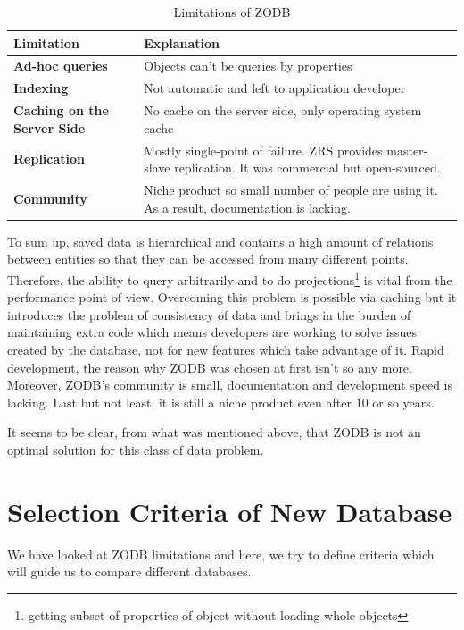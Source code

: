 \begin{table}[!ht]
  \centering
  \caption{Limitations of \textsc{ZODB}}
  \renewcommand{\arraystretch}{1.5}
  \begin{tabular}{| >{\centering\bfseries}m{2in} | >{\centering\arraybackslash}m{3.5in} |}
	\hline	
	\textbf{Limitation} & \textbf{Explanation} \\ \hline
    Ad-hoc queries & Objects can't be queries by properties \\ \hline
    Indexing & Not automatic and left to application developer \\ \hline
    Caching on the Server Side & No cache on the server side, only operating system cache \\ \hline
    Replication & Mostly single-point of failure. \textsc{ZRS} provides master-slave replication. It was commercial but open-sourced. \\ \hline
    Community & Niche product so small number of people are using it. As a result, documentation is lacking. \\ \hline	
  \end{tabular}
  \label{limitations}
\end{table}

To sum up, saved data is hierarchical and contains a high amount of relations between entities so that they can be accessed from many different points. Therefore, the ability to query arbitrarily and to do projections\footnote{getting subset of properties of object without loading whole objects} is vital from the performance point of view. Overcoming this problem is possible via caching but it introduces the problem of consistency of data and brings in the burden of maintaining extra code which means developers are working to solve issues created by the database, not for new features which take advantage of it. Rapid development, the reason why \textsc{ZODB} was chosen at first isn't so any more. Moreover, \textsc{ZODB}'s community is small, documentation and development speed is lacking. Last but not least, it is still a niche product even after 10 or so years.

It seems to be clear, from what was mentioned above, that \textsc{ZODB} is not an optimal solution for this class of data problem.

\section{Selection Criteria of New Database}

We have looked at \textsc{ZODB} limitations and here, we try to define criteria which will guide us to compare different databases.

